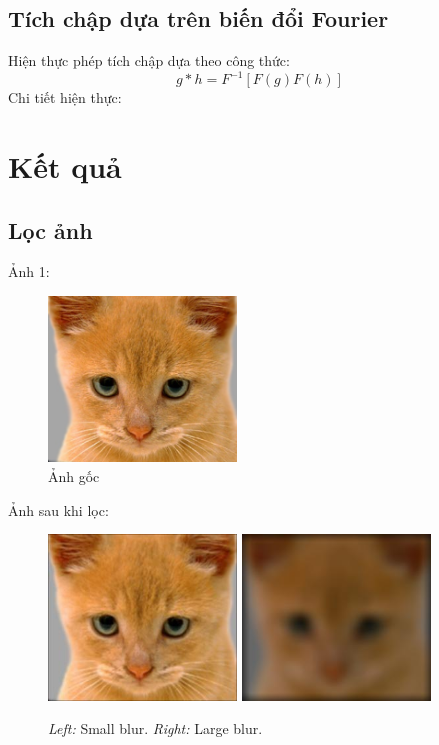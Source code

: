 \subsection*{Tích chập dựa trên biến đổi Fourier}
Hiện thực phép tích chập dựa theo công thức:
\begin{equation*}
    g*h=F^{-1}[F(g)F(h)]
\end{equation*}
Chi tiết hiện thực:


\section*{Kết quả}
\subsection*{Lọc ảnh}
Ảnh 1:
\begin{figure}[h]
    \centering
    \includegraphics[width=5cm]{images/results_part1/cat/01_cat.jpg}
    \caption{Ảnh gốc}
\end{figure}

Ảnh sau khi lọc:
\begin{figure}[H]
    \centering
    \includegraphics[width=5cm]{images/results_part1/cat/blur_image.jpg}
    \includegraphics[width=5cm]{images/results_part1/cat/large_blur_image.jpg}
    \caption{\emph{Left:} Small blur. \emph{Right:} Large blur.}
\end{figure}

